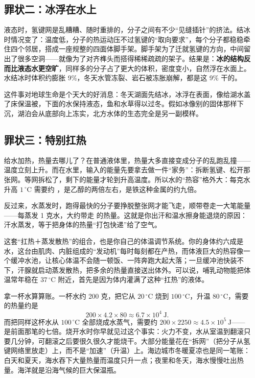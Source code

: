 \subsection{罪状二：冰浮在水上}

液态时，氢键网是乱糟糟、随时重排的，分子之间有不少“见缝插针”的挤法。结冰时情况变了：温度低，分子的热运动压不过氢键的“取向要求”，每个分子都稳稳牵住四个邻居，搭成一座规整的四面体脚手架。脚手架为了迁就氢键的方向，中间留出了很多空洞——就像为了对齐榫头而搭得稀稀疏疏的架子。结果是：\textbf{冰的结构反而比液态水更空旷}，同样多的分子占了更大的体积，密度变小，自然浮在水面上。水结冰时体积约膨胀 9\%，冬天水管冻裂、岩石被冻胀崩解，都是这 9\% 干的。

这件事对地球生命是个天大的好消息：冬天湖面先结冰，冰浮在表面，像给湖水盖了床保温被，下面的水保持液态，鱼和水草得以过冬。假如冰像别的固体那样下沉，湖泊会从底部向上冻实，北方水体的生态完全是另一副模样。

\subsection{罪状三：特别扛热}

给水加热，热量去哪儿了？在普通液体里，热量大多直接变成分子的乱跑乱撞——温度立刻上升。而在水里，输入的能量先要拿去做一件“家务”：拆断氢键、松开那张网。等网拆松了，剩下的能量才轮到升高温度。所以水的“热容”格外大：每克水升高 $1\,^{\circ}\mathrm{C}$ 需要约 ，是乙醇的两倍左右，是铁这种金属的约九倍。

反过来，水蒸发时，跑得最快的分子要挣脱整张网才能飞走，顺带卷走一大笔能量——每蒸发 1 克水，大约带走  的热量。这就是你出汗和温水擦身能退烧的原因：汗水蒸发，等于把身体的热量“打包快递”给了空气。

这套“扛热＋蒸发散热”的组合，也是你自己的体温调节系统。你的身体约六成是水，这台由肌肉、内脏组成的“发动机”每时每刻都在产热，而体液巨大的热容像一个缓冲水池，让核心体温不会随一顿饭、一阵奔跑大起大落；一旦缓冲池快装不下，汗腺就启动蒸发散热，把多余的热量直接送出体外。可以说，哺乳动物能把体温常年稳在 $37\,^{\circ}\mathrm{C}$ 附近，首先是因为体内灌满了这种“扛热”的液体。

\begin{qiaoliang}
拿一杯水算算账。一杯水约 200 克，把它从 $20\,^{\circ}\mathrm{C}$ 烧到 $100\,^{\circ}\mathrm{C}$，升温 $80\,^{\circ}\mathrm{C}$，需要的热量约是
\[200 \times 4.2 \times 80 \approx 6.7\times 10^{4}\ \mathrm{J}.\]
而把同样这杯水从 $100\,^{\circ}\mathrm{C}$ 全部烧成水蒸气，需要约 $200 \times 2250 \approx 4.5\times 10^{5}\ \mathrm{J}$——是前面那笔的七倍。烧开水时你早就见过这个事实：火力不变，水从室温到翻滚只要几分钟，可翻滚之后要很久很久才能烧干。大部分能量花在“拆网”（把分子从氢键网络里放走）上，而不是“加速”（升温）上。海边城市冬暖夏凉也是同一笔账：白天和夏天，海水吞下大量热量而温度只升一点；夜里和冬天，海水慢慢吐出热量。海洋就是沿海气候的巨大保温瓶。
\end{qiaoliang}

